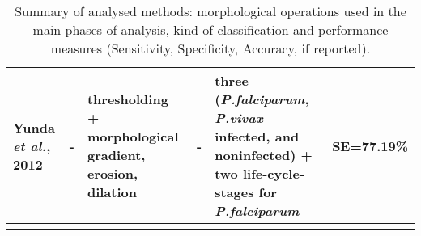 \begin{longtable}{C{1.4cm} C{1.5cm} C{2.1cm} C{1.5cm} C{2.7cm} C{2.2cm} }
Yunda \emph{et al.}, 2012  &
   	- &
   	thresholding + morphological gradient, erosion, dilation  &
   	- &
   	three (\emph{P.falciparum}, \emph{P.vivax} infected, and noninfected) + two life-cycle-stages for \emph{P.falciparum}&
   	SE=77.19\% \\
   	  	
 \hline
	
			
\caption{Summary of analysed methods: morphological operations used in the main phases of analysis, kind of classification and performance measures (Sensitivity, Specificity, Accuracy, if reported).} %
\label{tab:summary_table}
\end{longtable}

